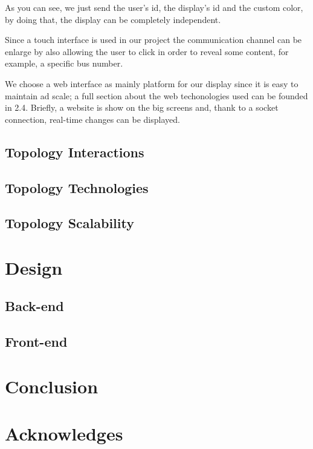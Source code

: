 \documentclass[]{usiinfbachelorproject}
\begin{document}

As you can see, we just send the user's id, the display's id and the custom color, by doing that, the display can be completely independent.

Since a touch interface is used in our project the communication channel can be enlarge by also allowing the user to click in order to reveal some content, for example, a specific bus number.

 We choose a web interface as mainly platform for our display since it is easy to maintain ad  scale; a full section about the web techonologies used can be founded in 2.4. Briefly, a website is show on the big screens and, thank to a socket connection, real-time changes can be displayed.
\subsection{Topology Interactions}
\subsection{Topology Technologies}
\subsection{Topology Scalability}
\section{Design}
\subsection{Back-end}
\subsection{Front-end}
\section{Conclusion}
\section{Acknowledges}

\newpage





\end{document}
